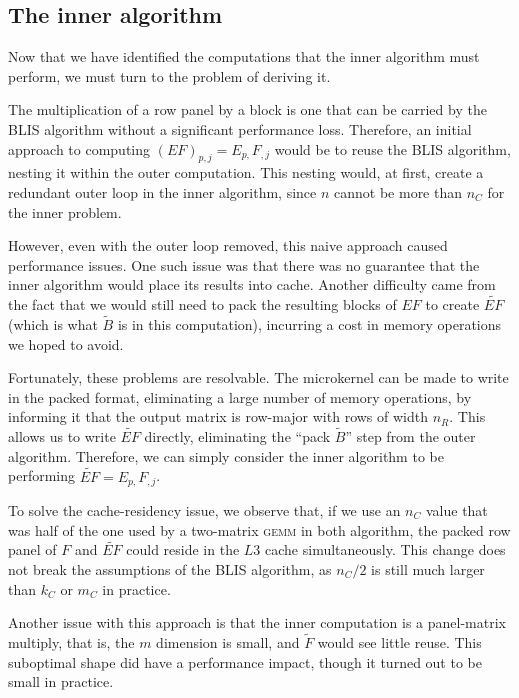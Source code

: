 \documentclass[12pt]{article}
\newcommand*{\gemm}{{\textsc{gemm}}}
\begin{document}
\subsection{The inner algorithm}
Now that we have identified the computations that the inner algorithm must perform, we must turn to the problem of deriving it.

The multiplication of a row panel by a block is one that can be carried by the BLIS algorithm without a significant performance loss.
Therefore, an initial approach to computing $(EF)_{p, j} = E_{p,}F_{,j}$ would be to reuse the BLIS algorithm, nesting it within the outer computation.
This nesting would, at first, create a redundant outer loop in the inner algorithm, since $n$ cannot be more than $n_C$ for the inner problem.

However, even with the outer loop removed, this naive approach caused performance issues.
One such issue was that there was no guarantee that the inner algorithm would place its results into cache.
Another difficulty came from the fact that we would still need to pack the resulting blocks of $EF$ to create $\widetilde{EF}$ (which is what $\widetilde{B}$ is in this computation), incurring a cost in memory operations we hoped to avoid.

Fortunately, these problems are resolvable.
The microkernel can be made to write in the packed format, eliminating a large number of memory operations, by informing it that the output matrix is row-major with rows of width $n_R$.
This allows us to write $\widetilde{EF}$ directly, eliminating the ``pack $\widetilde{B}$'' step from the outer algorithm.
Therefore, we can simply consider the inner algorithm to be performing $\widetilde{EF} = E_{p,}F_{,j}$.

To solve the cache-residency issue, we observe that, if we use an $n_C$ value that was half of the one used by a two-matrix \gemm{} in both algorithm, the packed row panel of $F$ and $\widetilde{EF}$ could reside in the $L3$ cache simultaneously.
This change does not break the assumptions of the BLIS algorithm, as $n_C/2$ is still much larger than $k_C$ or $m_C$ in practice.

Another issue with this approach is that the inner computation is a panel-matrix multiply, that is, the $m$ dimension is small, and $\widetilde{F}$ would see little reuse.
This suboptimal shape did have a performance impact, though it turned out to be small in practice.
\end{document}

